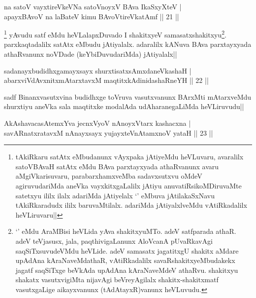 \begin{shl}
na satoV vayxtireVkeVNa satoV\s noyxV BAva IkaSxyXteV |\\
apayxBAvoV na laBateV kimu BAvoV\s tireVkatAmf \hfill || 21 ||
\end{shl}

\begin{artha}
\footnote[1]{tAkiRkaru satAtx eMbudanunx vAyxpaka jAtiyeMdu heVLuvaru, avaralilx satoVBAvaH satAtx eMdu BAva parxtayxyada athaRvanunx avaru aMgiVkarisuvaru, parabarxhamxveMba sadavxsutxvu oMdeV agiruvudariMda aneVka vayxkitxgaLalilx jAtiyu anuvatiRsikoMDiruvaMte satetxyu ililx ilalx adariMda jAtiyelalx `\stext ' eMbuva jAtilakaSxNavu tAkiRkaradudx ililx baruvaMtilalx. adariMda jAtiyalxlveMdu vAtiRkadalilx heVLiruvaru||} yAvudu satf eMdu heVLalapxDuvado I shakitxyeV samasatxshakitxyu\footnote[2]{`\stext ' eMdu AraMBisi heVLida yAva shakitxyuMTo.  adeV satfparada athaR. adeV teVjasusx, jala, paqthivigaLanunx AloVcanA pUvaRkavAgi saqSiTxsuvudeVMdu heVLide. adeV samasatx jagatitxgU shakitx aMdare upAdAna kAraNaveMdathaR, vAtiRkadalilx savaRshakitxyeMbudakekx jagatf saqSiTxge beVkAda upAdAna kAraNaveMdeV athaRvu. shakitxyu shakatx vasutxvigiMta nijavAgi beVreyAgilalx shakitx-shakitxmatf vasutxgaLige aikayxvanunx (tAdAtayxR)vanunx heVLuvudu.}. parxkaqtadalilx satAtx eMbudu jAtiyalalx. adaralilx kANuva BAva parxtayxyada athaRvanunx noVDade (keYbiDuvudariMda) jAtiyalalx||
\end{artha}


\begin{shl}
sadanayxbudidhxgamayxsayx shurxtisatxsAmxdaneVkashaH |\\
abarxviVdAvxnitxmAtarxtavxM maqtitxkAdinidashaRneYH \hfill || 22 ||
\end{shl}

\begin{artha}
sadf Binanxvasutxvina budidhxge toVruva vasutxvanunx BArxMti mAtarxveMdu shurxtiyu aneVka sala maqtitxke modalAda udAharanegaLiMda heVLiruvudu||
\end{artha}


\begin{shl}
AkAshavacasA\s \s temxYva jecnxVyoV nAnoyxV\s tarx kashacxna |\\
savARnatxratavxM nAnayxsayx yujayxteV\s nAtamxnoV yataH \hfill || 23 ||
\end{shl}

